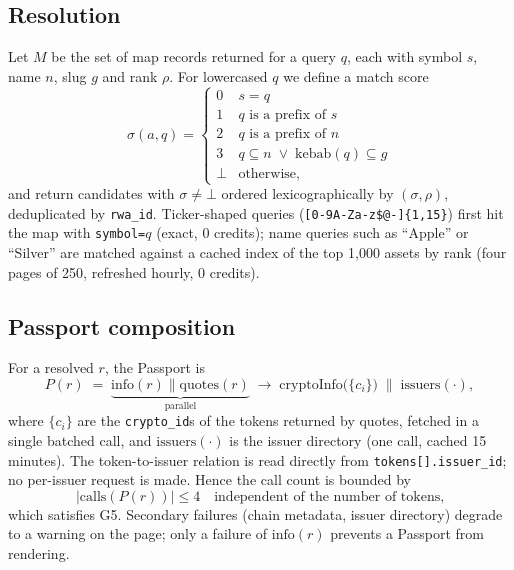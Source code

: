 \documentclass[11pt]{article}
\newcommand{\code}[1]{\texttt{\small #1}}
\begin{document}
\subsection{Resolution}
Let \(M\) be the set of map records returned for a query \(q\), each with symbol \(s\), name \(n\), slug \(g\) and rank \(\rho\). For lowercased \(q\) we define a match score
\begin{equation}
\sigma(a,q)=\begin{cases}
0 & s = q\\
1 & q \text{ is a prefix of } s\\
2 & q \text{ is a prefix of } n\\
3 & q \subseteq n \;\lor\; \mathrm{kebab}(q) \subseteq g\\
\bot & \text{otherwise,}
\end{cases}
\label{eq:rank}
\end{equation}
and return candidates with \(\sigma\neq\bot\) ordered lexicographically by \((\sigma,\rho)\), deduplicated by \code{rwa\_id}. Ticker-shaped queries (\code{[0-9A-Za-z\$@-]\{1,15\}}) first hit the map with \code{symbol=}\(q\) (exact, 0 credits); name queries such as ``Apple'' or ``Silver'' are matched against a cached index of the top 1,000 assets by rank (four pages of 250, refreshed hourly, 0 credits).

\subsection{Passport composition}
For a resolved \(r\), the Passport is
\begin{equation}
P(r) \;=\; \underbrace{\mathrm{info}(r) \parallel \mathrm{quotes}(r)}_{\text{parallel}} \;\to\; \mathrm{cryptoInfo}\big(\{c_i\}\big) \;\parallel\; \mathrm{issuers}(\cdot),
\label{eq:passport}
\end{equation}
where \(\{c_i\}\) are the \code{crypto\_id}s of the tokens returned by quotes, fetched in a single batched call, and \(\mathrm{issuers}(\cdot)\) is the issuer directory (one call, cached 15 minutes). The token-to-issuer relation is read directly from \code{tokens[].issuer\_id}; no per-issuer request is made. Hence the call count is bounded by
\begin{equation}
|\mathrm{calls}(P(r))| \le 4 \quad\text{independent of the number of tokens,}
\end{equation}
which satisfies G5. Secondary failures (chain metadata, issuer directory) degrade to a warning on the page; only a failure of \(\mathrm{info}(r)\) prevents a Passport from rendering.
\end{document}
